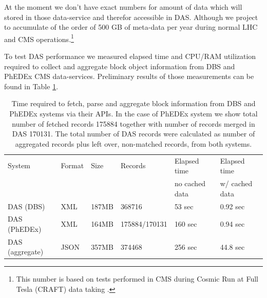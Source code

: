 \documentclass[a4paper]{jpconf}
\begin{document}
At the moment we don't have exact numbers for amount of data which will stored 
in those data-service and therefor accessible in DAS. Although we project to
accumulate of the order of 500 GB of meta-data per year during normal LHC and CMS
operations.\footnote{This number is based on tests 
performed in CMS during Cosmic Run at Full Tesla (CRAFT) data taking \cite{CRAFT09}.}

To test DAS performance we measured elapsed time and CPU/RAM utilization
required to collect and aggregate block object information from DBS and 
PhEDEx CMS data-services. Preliminary results of those measurements can
be found in Table \ref{DAS_benchmark}. 

\begin{table}[hbt]
\centering
\begin{tabular}{llllll}\hline
\hline

System & Format & Size & Records & Elapsed time & Elapsed time \\
& & & & no cached data & w/ cached data \\
\hline
DAS (DBS) & XML & 187MB & 368716 & 53 sec & 0.92 sec \\
DAS (PhEDEx) & XML & 164MB & 175884/170131 & 160 sec & 0.94 sec \\
DAS (aggregate) & JSON & 357MB & 374468 & 256 sec & 44.8 sec \\
\hline
\hline
\end{tabular}
\caption{Time required to fetch, parse and aggregate block information
from DBS and PhEDEx systems via their APIs. In the case of PhEDEx
system we show total number of fetched records 175884 together with
number of records merged in DAS 170131. The total number of DAS records 
were calculated as number of aggregated records plus left over, non-matched records,
from both systems.}
\label{DAS_benchmark}
\end{table}
\end{document}
